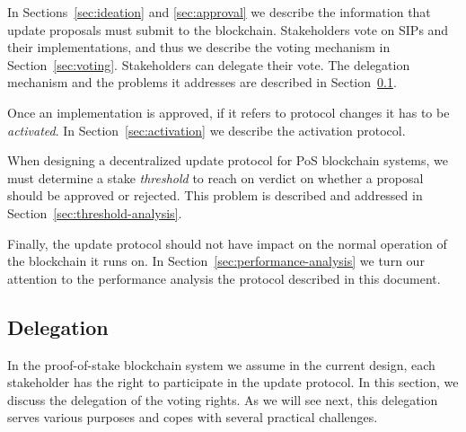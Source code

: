 \documentclass[11pt,a4paper]{article}
\begin{document}
In Sections~\ref{sec:ideation} and \ref{sec:approval} we describe the
information that update proposals must submit to the blockchain. Stakeholders
vote on SIPs and their implementations, and thus we describe the voting
mechanism in Section~\ref{sec:voting}. Stakeholders can delegate their vote. The
delegation mechanism and the problems it addresses are described in
Section~\ref{sec:delegation}.

Once an implementation is approved, if it refers to protocol changes it has to
be \emph{activated}. In Section~\ref{sec:activation} we describe the activation
protocol.

When designing a decentralized update protocol for PoS blockchain systems, we
must determine a stake \emph{threshold} to reach on verdict on whether a
proposal should be approved or rejected. This problem is described and addressed
in Section~\ref{sec:threshold-analysis}.

Finally, the update protocol should not have impact on the normal operation of
the blockchain it runs on. In Section~\ref{sec:performance-analysis} we turn our
attention to the performance analysis the protocol described in this document.


\subsection{Delegation}
\label{sec:delegation}

In the proof-of-stake blockchain system we assume in the current design, each
stakeholder has the right to participate in the update protocol.
%
In this section, we discuss the delegation of the voting rights. As we will see
next, this delegation serves various purposes and copes with several practical
challenges.
\end{document}
